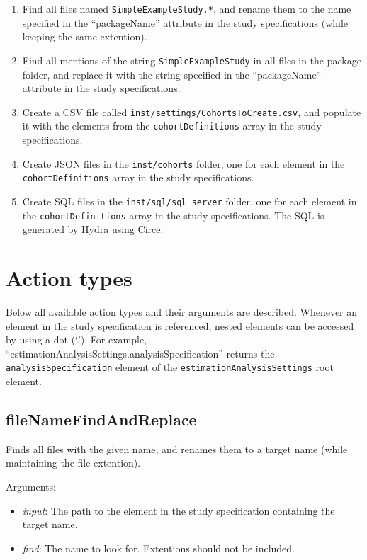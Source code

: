\documentclass[]{article}
\providecommand{\tightlist}{%
  \setlength{\itemsep}{0pt}\setlength{\parskip}{0pt}}
\begin{document}
\begin{enumerate}
\def\labelenumi{\arabic{enumi}.}
\tightlist
\item
  Find all files named \texttt{SimpleExampleStudy.*}, and rename them to
  the name specified in the ``packageName'' attribute in the study
  specifications (while keeping the same extention).
\item
  Find all mentions of the string \texttt{SimpleExampleStudy} in all
  files in the package folder, and replace it with the string specified
  in the ``packageName'' attribute in the study specifications.
\item
  Create a CSV file called \texttt{inst/settings/CohortsToCreate.csv},
  and populate it with the elements from the \texttt{cohortDefinitions}
  array in the study specifications.
\item
  Create JSON files in the \texttt{inst/cohorts} folder, one for each
  element in the \texttt{cohortDefinitions} array in the study
  specifications.
\item
  Create SQL files in the \texttt{inst/sql/sql\_server} folder, one for
  each element in the \texttt{cohortDefinitions} array in the study
  specifications. The SQL is generated by Hydra using Circe.
\end{enumerate}

\hypertarget{action-types}{%
\section{Action types}\label{action-types}}

Below all available action types and their arguments are described.
Whenever an element in the study specification is referenced, nested
elements can be accessed by using a dot (`.'). For example,
``estimationAnalysisSettings.analysisSpecification'' returns the
\texttt{analysisSpecification} element of the
\texttt{estimationAnalysisSettings} root element.

\hypertarget{filenamefindandreplace}{%
\subsection{fileNameFindAndReplace}\label{filenamefindandreplace}}

Finds all files with the given name, and renames them to a target name
(while maintaining the file extention).

Arguments:

\begin{itemize}
\tightlist
\item
  \emph{input}: The path to the element in the study specification
  containing the target name.
\item
  \emph{find}: The name to look for. Extentions should not be included.
\end{itemize}
\end{document}
